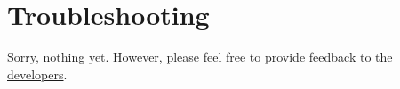 \chapter{Troubleshooting}

Sorry, nothing yet.
However, please feel free to \href{http://sourceforge.net/projects/powerfactory-fmu/support}{provide feedback to the developers}.